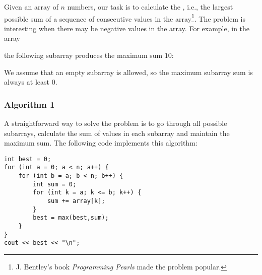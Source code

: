 Given an array of $n$ numbers,
our task is to calculate the
, i.e.,
the largest possible sum of
a sequence of consecutive values
in the array\footnote{J. Bentley's
book \emph{Programming Pearls} \cite{ben86} made the problem popular.}.
The problem is interesting when there may be
negative values in the array.
For example, in the array
\begin{center}
\end{center}
\begin{samepage}
the following subarray produces the maximum sum $10$:
\begin{center}
\end{center}
\end{samepage}

We assume that an empty subarray is allowed,
so the maximum subarray sum is always at least $0$.

\subsubsection{Algorithm 1}

A straightforward way to solve the problem
is to go through all possible subarrays,
calculate the sum of values in each subarray and maintain
the maximum sum.
The following code implements this algorithm:

\begin{lstlisting}
int best = 0;
for (int a = 0; a < n; a++) {
    for (int b = a; b < n; b++) {
        int sum = 0;
        for (int k = a; k <= b; k++) {
            sum += array[k];
        }
        best = max(best,sum);
    }
}
cout << best << "\n";
\end{lstlisting}

